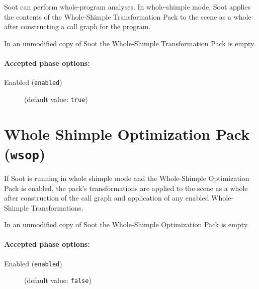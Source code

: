 \documentclass{article}
\begin{document}
\par

Soot can perform whole-program analyses.  In whole-shimple mode, Soot
applies the contents of the Whole-Shimple Transformation Pack to the
scene as a whole after constructing a call graph for the program.

\par

In an unmodified copy of Soot the Whole-Shimple Transformation
Pack is empty.
        

\paragraph{Accepted phase options:} 

\begin{description}

\item[Enabled ({\tt enabled})]
(default value: {\tt true})






\end{description}

\section{Whole Shimple Optimization Pack ({\tt wsop})}


\par

If Soot is running in whole shimple mode and the Whole-Shimple
Optimization Pack is enabled, the pack's transformations are
applied to the scene as a whole after construction of the call
graph and application of any enabled Whole-Shimple
Transformations.

\par

In an unmodified copy of Soot the Whole-Shimple Optimization
Pack is empty.
        

\paragraph{Accepted phase options:} 

\begin{description}

\item[Enabled ({\tt enabled})]
(default value: {\tt false})






\end{description}
\end{document}
